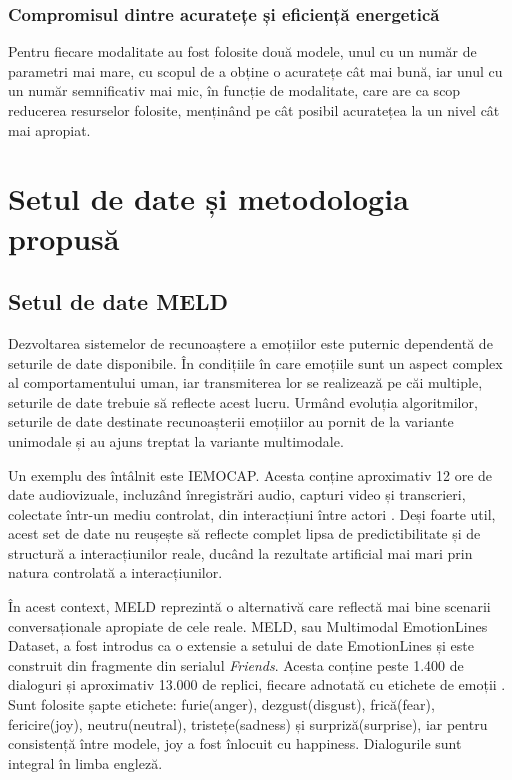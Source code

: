 \documentclass[12pt, a4paper]{article}
\begin{document}
\subsubsection{Compromisul dintre acuratețe și eficiență energetică}
Pentru fiecare modalitate au fost folosite două modele, unul cu un număr de parametri mai mare, cu scopul de a obține o acuratețe cât mai bună, iar unul cu un număr semnificativ mai mic, în funcție de modalitate, care are ca scop reducerea resurselor folosite, menținând pe cât posibil acuratețea la un nivel cât mai apropiat.

\newpage

\newpage
\section{Setul de date și metodologia propusă}

\subsection{Setul de date MELD}

Dezvoltarea sistemelor de recunoaștere a emoțiilor este puternic dependentă de seturile de date disponibile. În condițiile în care emoțiile sunt un aspect complex al comportamentului uman, iar transmiterea lor se realizează pe căi multiple, seturile de date trebuie să reflecte acest lucru. Urmând evoluția algoritmilor, seturile de date destinate recunoașterii emoțiilor au pornit de la variante unimodale și au ajuns treptat la variante multimodale.

Un exemplu des întâlnit este IEMOCAP. Acesta conține aproximativ 12 ore de date audiovizuale, incluzând înregistrări audio, capturi video și transcrieri, colectate într-un mediu controlat, din interacțiuni între actori \cite{busso2008iemocap}. Deși foarte util, acest set de date nu reușește să reflecte complet lipsa de predictibilitate și de structură a interacțiunilor reale, ducând la rezultate artificial mai mari prin natura controlată a interacțiunilor.

În acest context, MELD reprezintă o alternativă care reflectă mai bine scenarii conversaționale apropiate de cele reale. MELD, sau Multimodal EmotionLines Dataset, a fost introdus ca o extensie a setului de date EmotionLines și este construit din fragmente din serialul \textit{Friends}. Acesta conține peste 1.400 de dialoguri și aproximativ 13.000 de replici, fiecare adnotată cu etichete de emoții \cite{poria2019meld}. Sunt folosite șapte etichete: furie(anger), dezgust(disgust), frică(fear), fericire(joy), neutru(neutral), tristețe(sadness) și surpriză(surprise), iar pentru consistență între modele, joy a fost înlocuit cu happiness. Dialogurile sunt integral în limba engleză.
\end{document}
